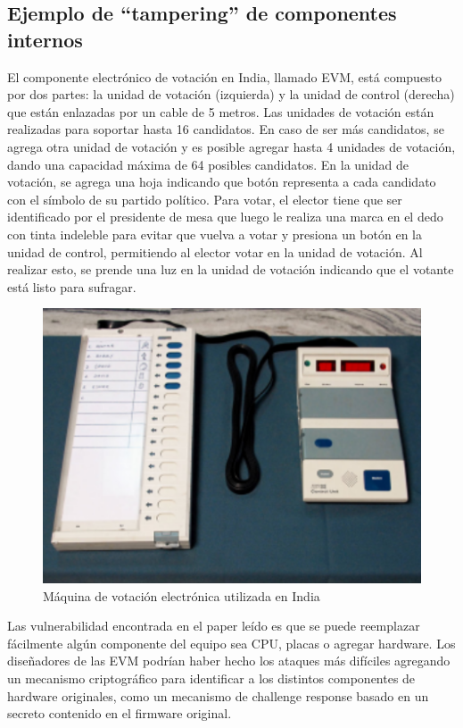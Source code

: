 \subsection{Ejemplo de ``tampering'' de componentes internos}

El componente electrónico de votación en India, llamado EVM, está compuesto por dos partes: la unidad de votación (izquierda) y la unidad de control (derecha) que están enlazadas por un cable de 5 metros. Las unidades de votación están realizadas para soportar hasta 16 candidatos. En caso de ser más candidatos, se agrega otra unidad de votación y es posible agregar hasta 4 unidades de votación, dando una capacidad máxima de 64 posibles candidatos. En la unidad de votación, se agrega una hoja indicando que botón representa a cada candidato con el símbolo de su partido político. Para votar, el elector tiene que ser identificado por el presidente de mesa que luego le realiza una marca en el dedo con tinta indeleble para evitar que vuelva a votar y presiona un botón en la unidad de control, permitiendo al elector votar en la unidad de votación. Al realizar esto, se prende una luz en la unidad de votación indicando que el votante está listo para sufragar.

\begin{figure}[H]
\includegraphics{Imagenes/almacenamiento1}
\caption{Máquina de votación electrónica utilizada en India}
\end{figure}

Las vulnerabilidad encontrada en el paper leído es que se puede reemplazar fácilmente algún componente del equipo sea CPU, placas o agregar hardware\cite{india}. Los diseñadores de las EVM podrían haber hecho los ataques más difíciles agregando un mecanismo criptográfico para identificar a los distintos componentes de hardware originales, como un mecanismo de challenge response basado en un secreto contenido en el firmware original.

